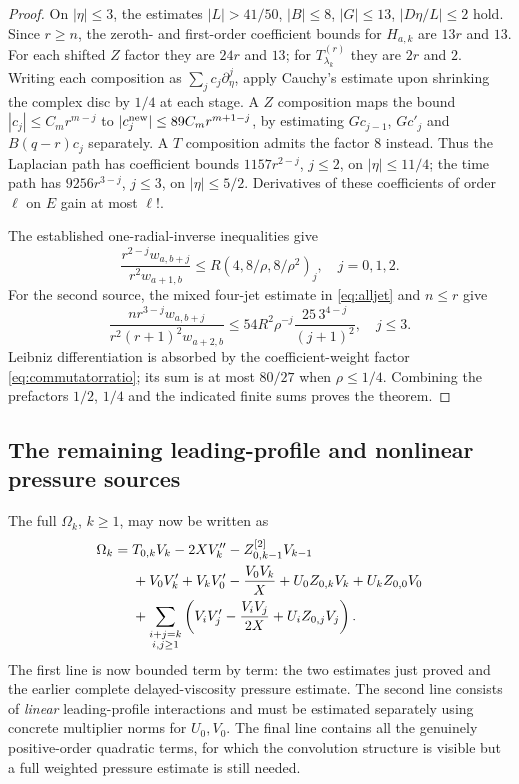 \begin{proof}
On $|\eta|\le3$, the estimates $|L|>41/50$,
$|B|\le8$, $|G|\le13$, $|D\eta/L|\le2$ hold.
Since $r\ge n$, the zeroth- and first-order coefficient
bounds for $H_{a,k}$ are $13r$ and $13$.
For each shifted $Z$ factor they are $24r$ and $13$;
for $T_{\lambda_k}^{(r)}$ they are $2r$ and $2$.
Writing each composition as $\sum_j c_j\partial_\eta^j$,
apply Cauchy's estimate upon shrinking the complex disc
by $1/4$ at each stage. A $Z$ composition maps the bound
$|c_j|\le C_mr^{m-j}$ to
$|c_j^{\rm new}|\le89C_mr^{m+1-j}$, by estimating
$Gc_{j-1}$, $Gc'_j$ and $B(q-r)c_j$ separately.
A $T$ composition admits the factor $8$ instead.
Thus the Laplacian path has coefficient bounds
$1157r^{2-j}$, $j\le2$, on $|\eta|\le11/4$;
the time path has $9256r^{3-j}$, $j\le3$,
on $|\eta|\le5/2$. Derivatives of these coefficients
of order $\ell$ on $E$ gain at most $\ell!$.

The established one-radial-inverse inequalities give
\[
 \frac{r^{2-j}w_{a,b+j}}{r^2w_{a+1,b}}
 \le R(4,8/\rho,8/\rho^2)_j,\quad j=0,1,2.
\]
For the second source, the mixed four-jet estimate in
\eqref{eq:alljet} and $n\le r$ give
\[
 \frac{nr^{3-j}w_{a,b+j}}{r^2(r+1)^2w_{a+2,b}}
 \le54R^2\rho^{-j}\frac{25\,3^{4-j}}{(j+1)^2},
 \quad j\le3.
\]
Leibniz differentiation is absorbed by the coefficient-weight
factor \eqref{eq:commutatorratio}; its sum is at most $80/27$
when $\rho\le1/4$. Combining the prefactors $1/2$, $1/4$
and the indicated finite sums proves the theorem.
\end{proof}

\subsection{The remaining leading-profile and nonlinear pressure sources}
\label{subsec:nonlinear-pressure-ledger}

The full $\Omega_k$, $k\ge1$, may now be written as
\begin{align}
\Omega_k={}&T_{0,k}V_k-2XV_k''-Z_{0,k-1}^{[2]}V_{k-1}\notag\\
 &+V_0V_k'+V_kV_0'-\frac{V_0V_k}{X}
   +U_0Z_{0,k}V_k+U_kZ_{0,0}V_0\notag\\
 &+\sum_{\substack{i+j=k\\i,j\ge1}}
 \left(V_iV_j'-\frac{V_iV_j}{2X}+U_iZ_{0,j}V_j\right).
\label{eq:omega-complete-ledger}
\end{align}
The first line is now bounded term by term: the two estimates
just proved and the earlier complete delayed-viscosity pressure
estimate. The second line consists of \emph{linear}
leading-profile interactions and must be estimated separately
using concrete multiplier norms for $U_0,V_0$.
The final line contains all the genuinely positive-order
quadratic terms, for which the convolution structure is
visible but a full weighted pressure estimate is still needed.

